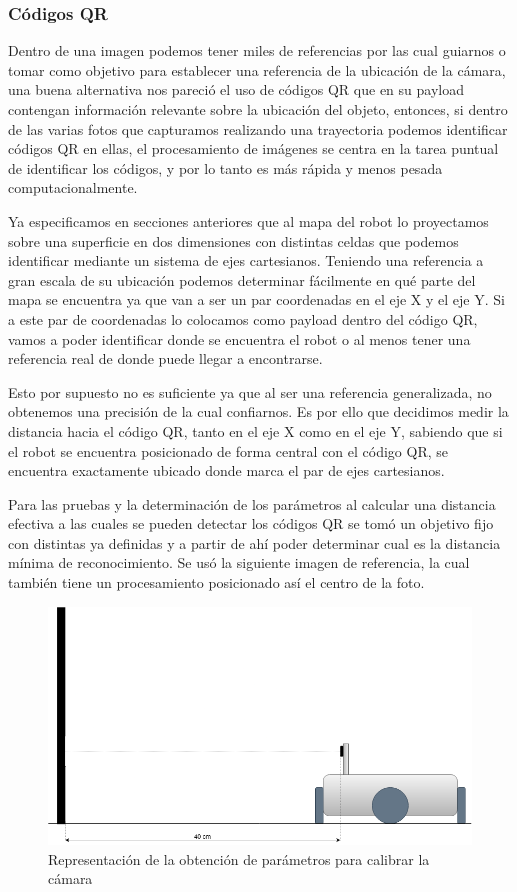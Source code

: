 \subsubsection{Códigos QR}

Dentro de una imagen podemos tener miles de referencias por las cual guiarnos o tomar como objetivo para establecer una referencia de la ubicación de la cámara, una buena alternativa nos pareció el uso de códigos QR que en su payload contengan información relevante sobre la ubicación del objeto, entonces, si dentro de las varias fotos que capturamos realizando una trayectoria podemos identificar códigos QR en ellas, el procesamiento de imágenes se centra en la tarea puntual de identificar los códigos, y por lo tanto es más rápida y menos pesada computacionalmente.

Ya especificamos en secciones anteriores que al mapa del robot lo proyectamos sobre una superficie en dos dimensiones con distintas celdas que podemos identificar mediante un sistema de ejes cartesianos. Teniendo una referencia a gran escala de su ubicación podemos determinar fácilmente en qué parte del mapa se encuentra ya que van a ser un par coordenadas en el eje X y el eje Y. Si a este par de coordenadas lo colocamos como payload dentro del código QR, vamos a poder identificar donde se encuentra el robot o al menos tener una referencia real de donde puede llegar a encontrarse.

Esto por supuesto no es suficiente ya que al ser una referencia generalizada, no obtenemos una precisión de la cual confiarnos. Es por ello que decidimos medir la distancia hacia el código QR, tanto en el eje X como en el eje Y, sabiendo que si el robot se encuentra posicionado de forma central con el código QR, se encuentra exactamente ubicado donde marca el par de ejes cartesianos.

Para las pruebas y la determinación de los parámetros al calcular una distancia efectiva a las cuales se pueden detectar los códigos QR se tomó un objetivo fijo con distintas ya definidas y a partir de ahí poder determinar cual es la distancia mínima de reconocimiento. Se usó la siguiente imagen de referencia, la cual también tiene un procesamiento posicionado así el centro de la foto.

\begin{figure}[H]
   \includegraphics[width=1.0\linewidth]{images/robot_medicion_qr.png}
   \caption{Representación de la obtención de parámetros para calibrar la cámara}
   \label{fig:robot_medicion_qr}
\end{figure}

